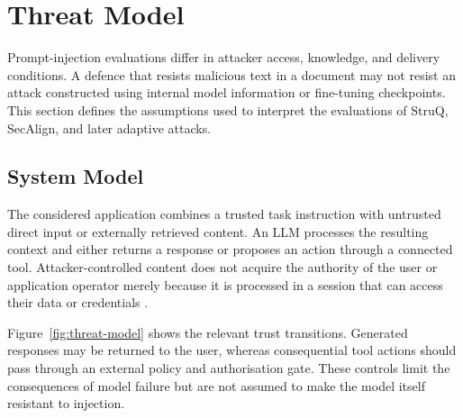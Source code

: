 \section{Threat Model}
\label{sec:threat}

Prompt-injection evaluations differ in attacker access, knowledge, and delivery
conditions. A defence that resists malicious text in a document may not resist
an attack constructed using internal model information or fine-tuning
checkpoints. This section defines the assumptions used to interpret the
evaluations of StruQ, SecAlign, and later adaptive attacks.

\subsection{System Model}
\label{subsec:system-model}

The considered application combines a trusted task instruction with untrusted
direct input or externally retrieved content. An LLM processes the resulting
context and either returns a response or proposes an action through a connected
tool. Attacker-controlled content does not acquire the authority of the user or
application operator merely because it is processed in a session that can access
their data or credentials
\parencites{greshake2023indirect}{debenedetti2024agentdojo}.

Figure~\ref{fig:threat-model} shows the relevant trust transitions. Generated
responses may be returned to the user, whereas consequential tool actions should
pass through an external policy and authorisation gate. These controls limit the
consequences of model failure but are not assumed to make the model itself
resistant to injection.

